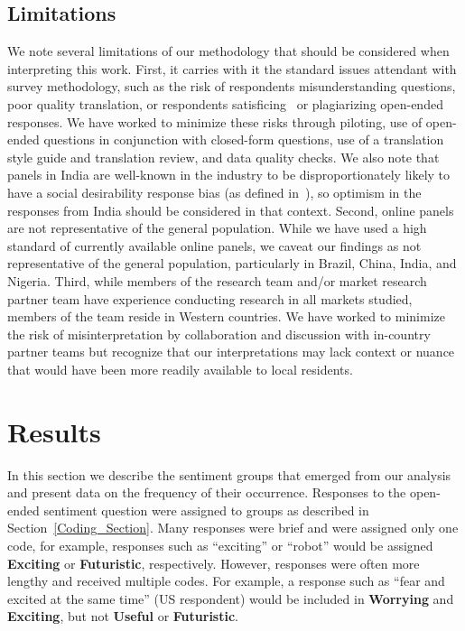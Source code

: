 \documentclass[11pt]{article} %
\def\Exciting/{{\fontfamily{lmss}\selectfont\textbf{Exciting}}}  \def\Useful/{{\fontfamily{lmss}\selectfont\textbf{Useful}}}
\def\Worrying/{{\fontfamily{lmss}\selectfont\textbf{Worrying}}}
\def\Futuristic/{{\fontfamily{lmss}\selectfont\textbf{Futuristic}}}
\begin{document}
\subsection{Limitations}

We note several limitations of our methodology that should be considered when interpreting this work. First, it carries with it the standard issues attendant with survey methodology, such as the risk of respondents misunderstanding questions, poor quality translation, or respondents satisficing~\cite{holbrook2003telephone} or plagiarizing open-ended responses. We have worked to minimize these risks through piloting, use of open-ended questions in conjunction with closed-form questions, use of a translation style guide and translation review, and data quality checks. We also note that panels in India are well-known in the industry to be disproportionately likely to have a social desirability response bias (as defined in~\cite{holbrook2003telephone}), so optimism in the responses from India should be considered in that context. Second, online panels are not representative of the general population. While we have used a high standard of currently available online panels, we caveat our findings as not representative of the general population, particularly in Brazil, China, India, and Nigeria. Third, while members of the research team and/or market research partner team have experience conducting research in all markets studied, members of the team reside in Western countries. We have worked to minimize the risk of misinterpretation by collaboration and discussion with in-country partner teams but recognize that our interpretations may lack context or nuance that would have been more readily available to local residents.




\section{Results}\label{Sec:Results}
In this section we describe the sentiment groups that emerged from our analysis and present data on the frequency of their occurrence. Responses to the open-ended sentiment question were assigned to groups as described in Section~\ref{Coding_Section}. Many responses were brief and were assigned only one code, for example, responses such as ``exciting'' or ``robot'' would be assigned \Exciting/ or \Futuristic/, respectively. However, responses were often more lengthy and received multiple codes. For example, a response such as ``fear and excited at the same time'' (US respondent) would be included in \Worrying/ and \Exciting/, but not \Useful/ or \Futuristic/.
\end{document}

